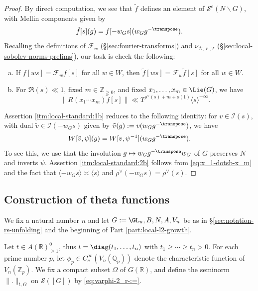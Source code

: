 \begin{proof}
  By direct computation, we see that $\tilde{f}$ defines an element of $\mathcal{S}^e(N \backslash G)$, with Mellin components given by
  \begin{equation*}
    \tilde{f}[s](g) = f[- w_G s](w_G g^{-\transpose}).
  \end{equation*}
  Recalling the definitions of $\mathcal{F}_w$ (\S\ref{sec:fourier-transforms}) and $\nu_{\mathcal{D},\ell,T}$ (\S\ref{sec:local-sobolev-norms-prelims}), our task is check the following:
  \begin{enumerate}[(a)]
  \item \label{itm:local-standard:1b} If $f[w s] = \mathcal{F}_w f[s]$ for all $w \in W$, then $\tilde{f}[w s] = \mathcal{F}_{w} \tilde{f}[s]$ for all $w \in W$.
  \item \label{itm:local-standard:2b} For $\Re(s) \ll 1$, fixed $m \in \mathbb{Z}_{\geq 0}$, and fixed $x_1,\dotsc,x_m \in \Lie(G)$, we have
    \begin{equation*}
      \|R(x_1 \dotsb x_m) \tilde{f}[s]\| \ll T^{\rho^\vee(s) + m + o(1)} \langle s \rangle^{-\infty}.
    \end{equation*}
  \end{enumerate}
  Assertion \eqref{itm:local-standard:1b} reduces to the following identity: for $v \in \mathcal{I}(s)$, with dual $\tilde{v} \in \mathcal{I}(- w_G s)$ given by $\tilde{v}(g) := v(w_G g^{-\transpose})$, we have
  \begin{equation*}
    W[\tilde{v},\psi](g) =W[v, \psi^{-1}](w_G g^{-\transpose}).
  \end{equation*}
  To see this, we use that the involution $g \mapsto w_G g^{-\transpose} w_G$ of $G$ preserves $N$ and inverts $\psi$.  Assertion \eqref{itm:local-standard:2b} follows from \eqref{eq:x_1-dotsb-x_m} and the fact that $\langle -w_G s \rangle \asymp \langle s \rangle$ and $\rho^\vee(-w_G s) = \rho^\vee(s)$.
\end{proof}


\subsection{Construction of theta functions}
We fix a natural number $n$ and let $G := \GL_n, B, N, A, V_n$ be as in \S\ref{sec:notation-rs-unfolding} and the beginning of Part \ref{part:local-l2-growth}.

Let $t \in A(\mathbb{R})^0_{\geq 1}$, thus $t = \diag(t_1,\dotsc,t_n)$ with $t_1 \geq \dotsb \geq t_n > 0$.  For each prime number $p$, let $\phi_p \in C_c^\infty(V_n(\mathbb{Q}_p))$ denote the characteristic function of $V_n(\mathbb{Z}_p)$.  We fix a compact subset $\Omega$ of $G(\mathbb{R})$, and define the seminorm $\|.\|_{t,\Omega}$ on $\mathcal{S}([G])$ by \eqref{eq:varphi-2_r-:=}.

